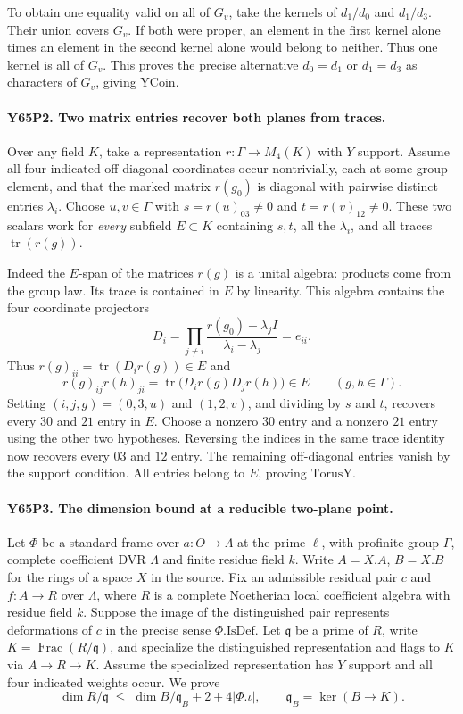 To obtain one equality valid on all of $G_v$, take the kernels of
$d_1/d_0$ and $d_1/d_3$. Their union covers $G_v$. If both were
proper, an element in the first kernel alone times an element in
the second kernel alone would belong to neither. Thus one kernel
is all of $G_v$. This proves the precise alternative $d_0=d_1$ or
$d_1=d_3$ as characters of $G_v$, giving $\mathrm{YCoin}$.

\paragraph{Y65P2. Two matrix entries recover both planes from traces.}
Over any field $K$, take a representation $r:\Gamma\to M_4(K)$ with
$Y$ support. Assume all four indicated off-diagonal coordinates occur
nontrivially, each at some group element, and that the marked matrix
$r(g_0)$ is diagonal with pairwise distinct entries $\lambda_i$.
Choose $u,v\in\Gamma$ with
$s=r(u)_{03}\ne0$ and $t=r(v)_{12}\ne0$. These two scalars work for
\emph{every} subfield $E\subset K$ containing $s,t$, all the
$\lambda_i$, and all traces $\operatorname{tr}(r(g))$.

Indeed the $E$-span of the matrices $r(g)$ is a unital algebra:
products come from the group law. Its trace is contained in $E$ by
linearity. This algebra contains the four coordinate projectors
\[
 D_i=\prod_{j\ne i}\frac{r(g_0)-\lambda_j I}{\lambda_i-\lambda_j}
     =e_{ii}.
\]
Thus $r(g)_{ii}=\operatorname{tr}(D_i r(g))\in E$ and
\[
 r(g)_{ij}r(h)_{ji}
     =\operatorname{tr}\bigl(D_i r(g)D_j r(h)\bigr)\in E
       \qquad(g,h\in\Gamma).
\]
Setting $(i,j,g)=(0,3,u)$ and $(1,2,v)$, and dividing by $s$ and $t$,
recovers every $30$ and $21$ entry in $E$. Choose a nonzero $30$ entry
and a nonzero $21$ entry using the other two hypotheses. Reversing the
indices in the same trace identity now recovers every $03$ and $12$
entry. The remaining off-diagonal entries vanish by the support
condition. All entries belong to $E$, proving $\mathrm{TorusY}$.

\paragraph{Y65P3. The dimension bound at a reducible two-plane point.}
Let $\Phi$ be a standard frame over $a:O\to\Lambda$ at the prime
$\ell$, with profinite group $\Gamma$, complete coefficient DVR
$\Lambda$ and finite residue field $k$. Write $A=X.A$, $B=X.B$ for
the rings of a space $X$ in the source. Fix an admissible residual
pair $c$ and $f:A\to R$ over $\Lambda$, where $R$ is a complete
Noetherian local coefficient algebra with residue field $k$. Suppose
the image of the distinguished pair represents deformations of $c$
in the precise sense $\Phi.\mathrm{IsDef}$. Let $\mathfrak q$ be a
prime of $R$, write $K=\operatorname{Frac}(R/\mathfrak q)$, and
specialize the distinguished representation and flags to $K$ via
$A\to R\to K$. Assume the specialized representation has $Y$ support
and all four indicated weights occur. We prove
\[
 \dim R/\mathfrak q\;\le\;\dim B/\mathfrak q_B+2+4|\Phi.\iota|,
 \qquad \mathfrak q_B=\ker(B\longrightarrow K).
\]

